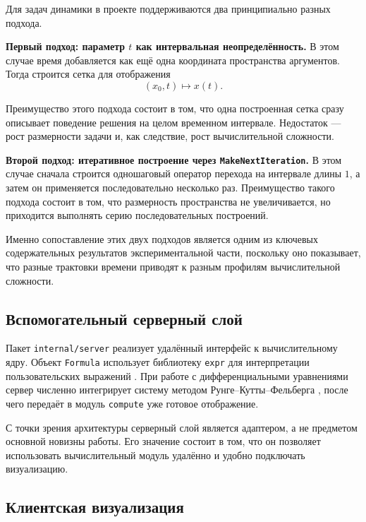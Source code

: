 Для задач динамики в проекте поддерживаются два принципиально разных подхода.

\textbf{Первый подход: параметр $t$ как интервальная неопределённость.} В этом случае время добавляется как ещё одна координата пространства аргументов. Тогда строится сетка для отображения
\begin{equation}
    (x_0, t) \mapsto x(t).
\end{equation}

Преимущество этого подхода состоит в том, что одна построенная сетка сразу описывает поведение решения на целом временном интервале. Недостаток --- рост размерности задачи и, как следствие, рост вычислительной сложности.

\textbf{Второй подход: итеративное построение через \texttt{MakeNextIteration}.} В этом случае сначала строится одношаговый оператор перехода на интервале длины $1$, а затем он применяется последовательно несколько раз. Преимущество такого подхода состоит в том, что размерность пространства не увеличивается, но приходится выполнять серию последовательных построений.

Именно сопоставление этих двух подходов является одним из ключевых содержательных результатов экспериментальной части, поскольку оно показывает, что разные трактовки времени приводят к разным профилям вычислительной сложности.

\subsection{Вспомогательный серверный слой}

Пакет \texttt{internal/server} реализует удалённый интерфейс к вычислительному ядру. Объект \texttt{Formula} использует библиотеку \texttt{expr} для интерпретации пользовательских выражений \cite{ExprLang}. При работе с дифференциальными уравнениями сервер численно интегрирует систему методом Рунге--Кутты--Фельберга \cite{Hairer1993}, после чего передаёт в модуль \texttt{compute} уже готовое отображение.

С точки зрения архитектуры серверный слой является адаптером, а не предметом основной новизны работы. Его значение состоит в том, что он позволяет использовать вычислительный модуль удалённо и удобно подключать визуализацию.

\subsection{Клиентская визуализация}

